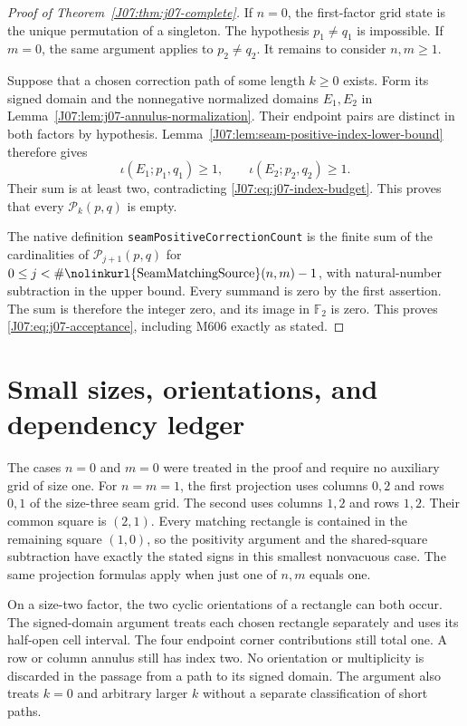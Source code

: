 \documentclass[11pt,oneside]{report}
\theoremstyle{definition}
\numberwithin{equation}{section}
\newcommand{\F}{\mathbb F_2}
\newcommand{\decl}[1]{\textnormal{\nolinkurl{#1}}}
\newcommand{\Paths}{\mathcal P}
\begin{document}
\begin{proof}[Proof of Theorem~\ref{J07:thm:j07-complete}]
If $n=0$, the first-factor grid state is the unique permutation of a
singleton. The hypothesis $p_1\ne q_1$ is impossible.
If $m=0$, the same argument applies to $p_2\ne q_2$.
It remains to consider $n,m\ge1$.

Suppose that a chosen correction path of some length $k\ge0$ exists.
Form its signed domain and the nonnegative normalized domains
$E_1,E_2$ in Lemma~\ref{J07:lem:j07-annulus-normalization}.
Their endpoint pairs are distinct in both factors by hypothesis.
Lemma~\ref{J07:lem:seam-positive-index-lower-bound} therefore gives
\[
 \iota(E_1;p_1,q_1)\ge1,\qquad
 \iota(E_2;p_2,q_2)\ge1.
\]
Their sum is at least two, contradicting
\eqref{J07:eq:j07-index-budget}.
This proves that every $\Paths_k(p,q)$ is empty.

The native definition \decl{seamPositiveCorrectionCount} is the finite
sum of the cardinalities of $\Paths_{j+1}(p,q)$ for
$0\le j<\#\decl{SeamMatchingSource}(n,m)-1$, with natural-number
subtraction in the upper bound.
Every summand is zero by the first assertion.
The sum is therefore the integer zero, and its image in $\F$ is zero.
This proves \eqref{J07:eq:j07-acceptance}, including M606 exactly as stated.
\end{proof}

\section{Small sizes, orientations, and dependency ledger}

The cases $n=0$ and $m=0$ were treated in the proof and require no
auxiliary grid of size one.
For $n=m=1$, the first projection uses columns $0,2$ and rows $0,1$
of the size-three seam grid. The second uses columns $1,2$ and rows
$1,2$. Their common square is $(2,1)$.
Every matching rectangle is contained in the remaining square $(1,0)$,
so the positivity argument and the shared-square subtraction have
exactly the stated signs in this smallest nonvacuous case.
The same projection formulas apply when just one of $n,m$ equals one.

On a size-two factor, the two cyclic orientations of a rectangle can
both occur. The signed-domain argument treats each chosen rectangle
separately and uses its half-open cell interval. The four endpoint
corner contributions still total one.
A row or column annulus still has index two.
No orientation or multiplicity is discarded in the passage from a
path to its signed domain.
The argument also treats $k=0$ and arbitrary larger $k$ without a
separate classification of short paths.
\end{document}
